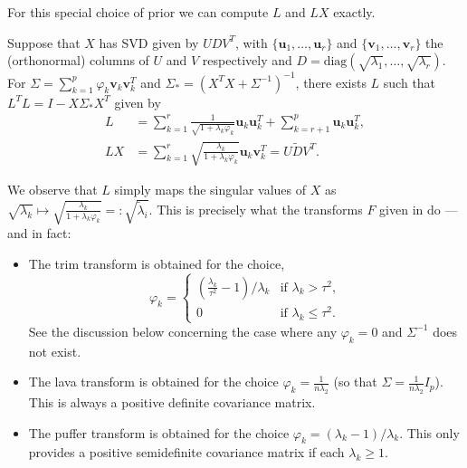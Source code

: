 \documentclass[11pt]{article}
\newcommand{\postCov}{\Sigma_*}
\numberwithin{equation}{section}
\begin{document}
For this special choice of prior we can compute $L$ and $LX$ exactly. 
\begin{lemma}\label{lem:L_and_LX}
	Suppose that $X$ has SVD given by $UDV^T$, with $\{\mathbf{u}_1, \dots, \mathbf{u}_r\}$ and $\{\mathbf{v}_1, \dots, \mathbf{v}_r\}$ the (orthonormal) columns of $U$ and $V$ respectively and $D = \textrm{diag}(\sqrt{\lambda_1}, \dots, \sqrt{\lambda_r})$. For $\Sigma = \sum_{k = 1}^p \varphi_k \mathbf{v}_k\mathbf{v}_k^T$ and $\postCov  = (X^TX + \Sigma^{-1})^{-1}$, there exists $L$ such that $L^TL = I - X\postCov X^T$ given by
	\begin{align*}
L &= \sum_{k = 1}^r \frac{1}{\sqrt{1+\lambda_k \varphi_k}} \mathbf{u}_k \mathbf{u}_k^T + \sum_{k = r + 1}^p \mathbf{u}_k \mathbf{u}_k^T	,	\\
LX &= \sum_{k = 1}^r \sqrt{\frac{\lambda_k}{1+\lambda_k\varphi_k}} \mathbf{u}_k \mathbf{v}_k^T = U\tilde{D}V^T.		
	\end{align*}
	
\end{lemma}
We observe that $L$ simply maps the singular values of $X$ as
	$
	\sqrt{\lambda_k} \mapsto \sqrt{\frac{\lambda_k}{1+\lambda_k \varphi_k}} =: \sqrt{\tilde{\lambda}_i}.
	$
This is precisely what the transforms $F$ given in \cite{CBM2020} do --- and
in fact:
\begin{itemize}
\item The trim transform is obtained for the choice,
$$
\varphi_k = \begin{cases}
 \left(\frac{\lambda_k}{\tau^2} - 1\right)/\lambda_k	 & \textrm{if } \lambda_k > \tau^2, \\
 0 & \textrm{if } \lambda_k \leq \tau^2.
 \end{cases}
$$
See the discussion below concerning the case where any $\varphi_k = 0$ and $\Sigma^{-1}$ does not exist.
\item The lava transform is obtained for the choice $\varphi_k = \frac{1}{n\lambda_2}$ (so that $\Sigma = \frac{1}{n\lambda_2} I_p$).	This is always a positive definite covariance matrix.
\item The puffer transform is obtained for the choice $\varphi_k = (\lambda_k - 1)/\lambda_k$. This only provides a positive semidefinite covariance matrix if each $\lambda_k \geq 1$.
\end{itemize}
\end{document}

